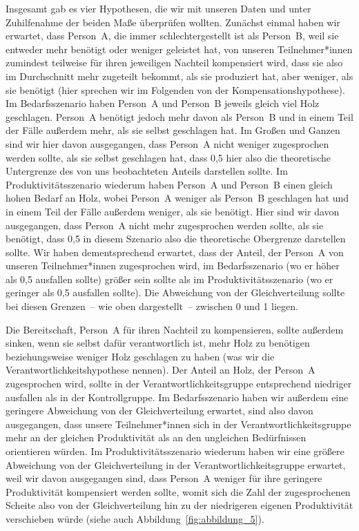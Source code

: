 \documentclass[justified,nobib,symmetric,twoside]{tufte-handout}
\begin{document}
Insgesamt gab es vier Hypothesen, die wir mit unseren Daten und unter Zuhilfenahme der beiden Maße überprüfen wollten.
Zunächst einmal haben wir erwartet, dass Person~A, die immer schlechtergestellt ist als Person~B, weil sie entweder mehr benötigt oder weniger geleistet hat, von unseren Teilnehmer*innen zumindest teilweise für ihren jeweiligen Nachteil kompensiert wird, dass sie also im Durchschnitt mehr zugeteilt bekommt, als sie produziert hat, aber weniger, als sie benötigt (hier sprechen wir im Folgenden von der Kompensationshypothese).
Im Bedarfsszenario haben Person~A und Person~B jeweils gleich viel Holz geschlagen.
Person~A benötigt jedoch mehr davon als Person~B und in einem Teil der Fälle außerdem mehr, als sie selbst geschlagen hat.
Im Großen und Ganzen sind wir hier davon ausgegangen, dass Person~A nicht weniger zugesprochen werden sollte, als sie selbst geschlagen hat, dass 0,5 hier also die theoretische Untergrenze des von uns beobachteten Anteils darstellen sollte.
Im Produktivitätsszenario wiederum haben Person~A und Person~B einen gleich hohen Bedarf an Holz, wobei Person~A weniger als Person~B geschlagen hat und in einem Teil der Fälle außerdem weniger, als sie benötigt.
Hier sind wir davon ausgegangen, dass Person~A nicht mehr zugesprochen werden sollte, als sie benötigt, dass 0,5 in diesem Szenario also die theoretische Obergrenze darstellen sollte.
Wir haben dementsprechend erwartet, dass der Anteil, der Person~A von unseren Teilnehmer*innen zugesprochen wird, im Bedarfsszenario (wo er höher als 0,5 ausfallen sollte) größer sein sollte als im Produktivitätsszenario (wo er geringer als 0,5 ausfallen sollte).
Die Abweichung von der Gleichverteilung sollte bei diesen Grenzen~-- wie oben dargestellt~-- zwischen 0 und 1 liegen.

Die Bereitschaft, Person~A für ihren Nachteil zu kompensieren, sollte außerdem sinken, wenn sie selbst dafür verantwortlich ist, mehr Holz zu benötigen beziehungsweise weniger Holz geschlagen zu haben (was wir die Verantwortlichkeitshypothese nennen).
Der Anteil an Holz, der Person~A zugesprochen wird, sollte in der Verantwortlichkeitsgruppe entsprechend niedriger ausfallen als in der Kontrollgruppe.
Im Bedarfsszenario haben wir außerdem eine geringere Abweichung von der Gleichverteilung erwartet, sind also davon ausgegangen, dass unsere Teilnehmer*innen sich in der Verantwortlichkeitsgruppe mehr an der gleichen Produktivität als an den ungleichen Bedürfnissen orientieren würden.
Im Produktivitätsszenario wiederum haben wir eine größere Abweichung von der Gleichverteilung in der Verantwortlichkeitsgruppe erwartet, weil wir davon ausgegangen sind, dass Person~A weniger für ihre geringere Produktivität kompensiert werden sollte, womit sich die Zahl der zugesprochenen Scheite also von der Gleichverteilung hin zu der niedrigeren eigenen Produktivität verschieben würde (siehe auch Abbildung~\ref{fig:abbildung_5}).
\end{document}
